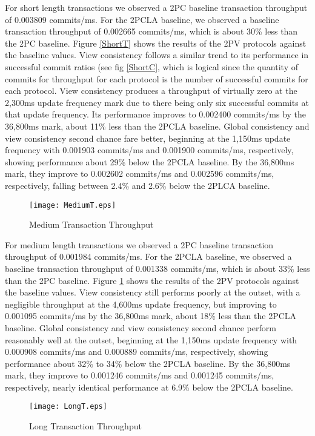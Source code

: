 \documentclass[11pt]{article}
\begin{document}
For short length transactions we observed a 2PC baseline transaction throughput of 0.003809 commits/ms. For the 2PCLA baseline, we observed a baseline transaction throughput of 0.002665 commits/ms, which is about 30\% less than the 2PC baseline. Figure \ref{ShortT} shows the results of the 2PV protocols against the baseline values. View consistency follows a similar trend to its performance in successful commit ratios (see fig \ref{ShortC}, which is logical since the quantity of commits for throughput for each protocol is the number of successful commits for each protocol. View consistency produces a throughput of virtually zero at the 2,300ms update frequency mark due to there being only six successful commits at that update frequency. Its performance improves to 0.002400 commits/ms by the 36,800ms mark, about 11\% less than the 2PCLA baseline. Global consistency and view consistency second chance fare better, beginning at the 1,150ms update frequency with 0.001903 commits/ms and 0.001900 commits/ms, respectively, showing performance about 29\% below the 2PCLA baseline. By the 36,800ms mark, they improve to 0.002602 commits/ms and 0.002596 commits/ms, respectively, falling between 2.4\% and 2.6\% below the 2PLCA baseline.
\begin{figure}[h]
\begin{center}
\texttt{[image: MediumT.eps]}
\caption{Medium Transaction Throughput}
\label{MediumT}
\end{center}
\end{figure}

For medium length transactions we observed a 2PC baseline transaction throughput of 0.001984 commits/ms. For the 2PCLA baseline, we observed a baseline transaction throughput of 0.001338 commits/ms, which is about 33\% less than the 2PC baseline. Figure \ref{MediumT} shows the results of the 2PV protocols against the baseline values. View consistency still performs poorly at the outset, with a negligible throughput at the 4,600ms update frequency, but improving to 0.001095 commits/ms by the 36,800ms mark, about 18\% less than the 2PCLA baseline. Global consistency and view consistency second chance perform reasonably well at the outset, beginning at the 1,150ms update frequency with 0.000908 commits/ms and 0.000889 commits/ms, respectively, showing performance about 32\% to 34\% below the 2PCLA baseline. By the 36,800ms mark, they improve to 0.001246 commits/ms and 0.001245 commits/ms, respectively, nearly identical performance at 6.9\% below the 2PCLA baseline.
\begin{figure}[h]
\begin{center}
\texttt{[image: LongT.eps]}
\caption{Long Transaction Throughput}
\label{LongT}
\end{center}
\end{figure}
\end{document}
